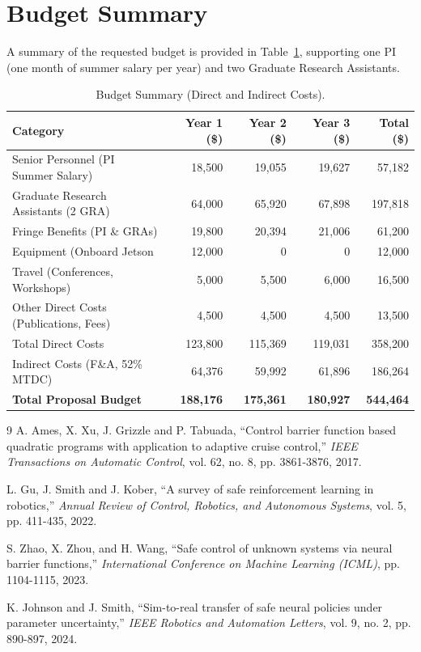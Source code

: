 \section{Budget Summary}
A summary of the requested budget is provided in Table~\ref{tab:budget}, supporting one PI (one month of summer salary per year) and two Graduate Research Assistants.

\begin{table}[h]
\setlength{\parindent}{0pt}
\setlength{\parskip}{0pt}
\centering
\caption{Budget Summary (Direct and Indirect Costs).}
\label{tab:budget}
\vspace{0.5em}
\begin{tabularx}{\textwidth}{X r r r r}
\toprule
\rowcolor{neutral-light} \textbf{Category} & \textbf{Year 1 (\$)} & \textbf{Year 2 (\$)} & \textbf{Year 3 (\$)} & \textbf{Total (\$)} \\
\midrule
Senior Personnel (PI Summer Salary) & 18,500 & 19,055 & 19,627 & 57,182 \\
Graduate Research Assistants (2 GRA) & 64,000 & 65,920 & 67,898 & 197,818 \\
Fringe Benefits (PI \& GRAs) & 19,800 & 20,394 & 21,006 & 61,200 \\
Equipment (Onboard Jetson & 12,000 & 0 & 0 & 12,000 \\
Travel (Conferences, Workshops) & 5,000 & 5,500 & 6,000 & 16,500 \\
Other Direct Costs (Publications, Fees) & 4,500 & 4,500 & 4,500 & 13,500 \\
\midrule
Total Direct Costs & 123,800 & 115,369 & 119,031 & 358,200 \\
Indirect Costs (F\&A, 52\% MTDC) & 64,376 & 59,992 & 61,896 & 186,264 \\
\midrule
\rowcolor{neutral-light} \textbf{Total Proposal Budget} & \textbf{188,176} & \textbf{175,361} & \textbf{180,927} & \textbf{544,464} \\
\bottomrule
\end{tabularx}
\end{table}

\begin{thebibliography}{9}
A. Ames, X. Xu, J. Grizzle and P. Tabuada, ``Control barrier function based quadratic programs with application to adaptive cruise control,'' \textit{IEEE Transactions on Automatic Control}, vol. 62, no. 8, pp. 3861-3876, 2017.

L. Gu, J. Smith and J. Kober, ``A survey of safe reinforcement learning in robotics,'' \textit{Annual Review of Control, Robotics, and Autonomous Systems}, vol. 5, pp. 411-435, 2022.

S. Zhao, X. Zhou, and H. Wang, ``Safe control of unknown systems via neural barrier functions,'' \textit{International Conference on Machine Learning (ICML)}, pp. 1104-1115, 2023.

K. Johnson and J. Smith, ``Sim-to-real transfer of safe neural policies under parameter uncertainty,'' \textit{IEEE Robotics and Automation Letters}, vol. 9, no. 2, pp. 890-897, 2024.
\end{thebibliography}
